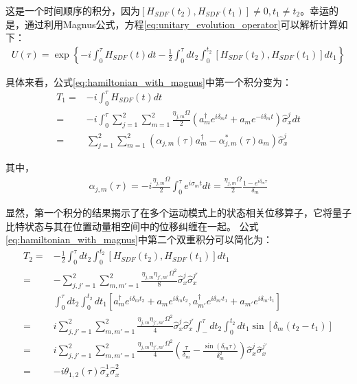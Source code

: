 这是一个时间顺序的积分，因为$[H_{SDF}(t_2),H_{SDF}(t_1)]\neq 0, t_1\neq t_2$。幸运的是，通过利用Magnus公式，方程\eqref{eq:unitary_evolution_operator}可以解析计算如下\cite[]{Lee_Brickman_Deslauriers_Haljan_Duan_Monroe_2005}：
\begin{align}
    U(\tau)=\exp\left\{-i\int_{0}^{\tau}H_{SDF}(t)dt-\frac{1}{2}\int_{0}^{\tau}dt_2\int_{0}^{t_2}[H_{SDF}(t_2),H_{SDF}(t_1)]dt_1\right\}\label{eq:hamiltonian_with_magnus}
\end{align}

具体来看，公式\eqref{eq:hamiltonian_with_magnus}中第一个积分变为：
\begin{align}
    T_1=&-i\int_{0}^{\tau}H_{SDF}(t)dt\\
    =&-i\int_{0}^{\tau}\sum_{j=1}^{2}\sum_{m=1}^{2}\frac{\eta_{j,m}\Omega}{2}\left(a_m^\dagger e^{i\delta_mt}+a_m e^{-i\delta_mt}\right)\hat{\sigma}_x^j dt\\
    =&\sum_{j=1}^{2}\sum_{m=1}^{2}\left(\alpha_{j,m}(\tau)a_m^\dagger-\alpha_{j,m}^*(\tau)a_m\right)\hat{\sigma}_x^j\label{eq:integral_t1}
\end{align}

其中，
\begin{align}
    \alpha_{j,m}(\tau)=-i\frac{\eta_{j,m}\Omega}{2}\int_{0}^{\tau}e^{i\sigma_m t}dt=\frac{\eta_{j,m}\Omega}{2}\frac{1-e^{i\delta_m\tau}}{\delta_m}\label{eq:alpha_j_m}
\end{align}

显然，第一个积分的结果揭示了在多个运动模式上的状态相关位移算子，它将量子比特状态与其在位置动量相空间中的位移纠缠在一起。
公式\eqref{eq:hamiltonian_with_magnus}中第二个双重积分可以简化为：
\begin{align}
    T_2=&-\frac{1}{2}\int_{0}^{\tau}dt_2\int_{0}^{t_2}[H_{SDF}(t_2),H_{SDF}(t_1)]dt_1\\
    =&-\sum_{j,j'=1}^{2}\sum_{m,m'=1}^{2}\frac{\eta_{j,m}\eta_{j',m'}\Omega^2}{8}\hat{\sigma}_x^j\hat{\sigma}_x^{j'}\\
    &\int_{0}^{\tau}dt_2\int_{0}^{t_2}dt_1\left[a_m^\dagger e^{i\delta_m t_2}+a_m e^{i\delta_m t_2}, a_{m'}^\dagger e^{i\delta_{m'} t_1}+a_{m'} e^{i\delta_{m'} t_1}\right]\\
    =&i\sum_{j,j'=1}^{2}\sum_{m,m'=1}^{2}\frac{\eta_{j,m}\eta_{j',m'}\Omega^2}{4}\hat{\sigma}_x^j\hat{\sigma}_x^{j'}\int_{-}^{\tau}dt_2\int_{0}^{t_2}dt_1\sin[\delta_m(t_2-t_1)]\\
    =&i\sum_{j,j'=1}^{2}\sum_{m,m'=1}^{2}\frac{\eta_{j,m}\eta_{j',m'}\Omega^2}{4}\left(\frac{\tau}{\delta_m}-\frac{\sin(\delta_m\tau)}{\delta_m^2}\right)\hat{\sigma}_x^j\hat{\sigma}_x^{j'}\\
    =&-i\theta_{1,2}(\tau)\hat{\sigma}_x^1\hat{\sigma}_x^2\label{eq:integral_t2}
\end{align}

